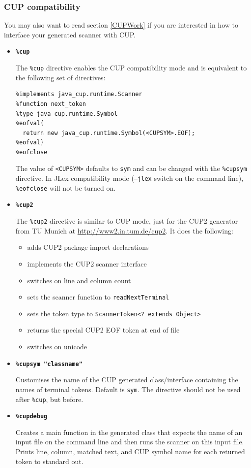 \documentclass[11pt]{scrartcl}
\begin{document}
\subsubsection{CUP compatibility}\label{CupMode}
You may also want to read section \ref{CUPWork} 
if you are interested in how to interface your generated
scanner with CUP.
\begin{itemize}
\item
{\bfseries \texttt{\%cup}}

The \texttt{\%cup} directive enables the CUP compatibility mode and is equivalent
to the following set of directives:

\begin{verbatim}
%implements java_cup.runtime.Scanner
%function next_token
%type java_cup.runtime.Symbol
%eofval{
  return new java_cup.runtime.Symbol(<CUPSYM>.EOF);
%eofval}
%eofclose
\end{verbatim}

The value of \texttt{<CUPSYM>} defaults to \texttt{sym} and can be
changed with the \texttt{\%cupsym} directive. In JLex compatibility
mode (\texttt{--jlex} switch on the command line), \texttt{\%eofclose}
will not be turned on.

\item
{\bfseries \texttt{\%cup2}}

The \texttt{\%cup2} directive is similar to CUP mode, just for the CUP2 generator
from TU Munich at \url{http://www2.in.tum.de/cup2}. It does the following:
\begin{itemize}
    \item adds CUP2 package import declarations
    \item implements the CUP2 scanner interface
    \item switches on line and column count
    \item sets the scanner function to \verb+readNextTerminal+
    \item sets the token type to \verb+ScannerToken<? extends Object>+
    \item returns the special CUP2 EOF token at end of file
    \item switches on unicode    
\end{itemize}

\item
{\bfseries \texttt{\%cupsym "classname"}}

Customises the name of the CUP generated class/interface 
containing the names of terminal tokens. Default is \texttt{sym}.
The directive should not be used after \texttt{\%cup}, but before.

\item
{\bfseries \texttt{\%cupdebug}}

Creates a main function in the generated class that expects the name
of an input file on the command line and then runs the scanner on this
input file. Prints line, column, matched text, and CUP symbol name for
each returned token to standard out.

\end{itemize}
\end{document}
